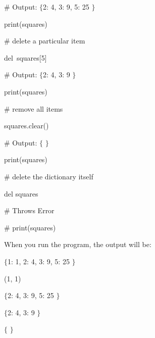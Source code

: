 \documentclass[a4paper,12pt]{report}
\begin{document}
\vspace{12pt}
\noindent 
 \hspace*{0.5in}  $  \#  $ Output:  $  \{  $2: 4, 3: 9, 5: 25 $  \}  $ \par
\noindent 
 \hspace*{0.5in} print(squares) \par
\vspace{12pt}
\noindent 
 \hspace*{0.5in}  $  \#  $ delete a particular item \par
\noindent 
 \hspace*{0.5in} del~squares[5]   \par
\vspace{12pt}
\noindent 
 \hspace*{0.5in}  $  \#  $ Output:  $  \{  $2: 4, 3: 9 $  \}  $ \par
\noindent 
 \hspace*{0.5in} print(squares) \par
\vspace{12pt}
\noindent 
 \hspace*{0.5in}  $  \#  $ remove all items \par
\noindent 
 \hspace*{0.5in} squares.clear() \par
\vspace{12pt}
\noindent 
 \hspace*{0.5in}  $  \#  $ Output:  $  \{  $ $  \}  $ \par
\noindent 
 \hspace*{0.5in} print(squares) \par
\vspace{12pt}
\noindent 
 \hspace*{0.5in}  $  \#  $ delete the dictionary itself \par
\noindent 
 \hspace*{0.5in} del squares \par
\vspace{12pt}
\noindent 
 \hspace*{0.5in}  $  \#  $ Throws Error \par
\noindent 
 \hspace*{0.5in}  $  \#  $ print(squares) \par
\noindent 
When you run the program, the output will be: \par
\noindent 
{\fontsize{11pt}{11pt}} \par
\noindent 
{\fontsize{11pt}{11pt}\selectfont  $  \{  $1: 1, 2: 4, 3: 9, 5: 25 $  \}  $} \par
\noindent 
{\fontsize{11pt}{11pt}\selectfont (1, 1)} \par
\noindent 
{\fontsize{11pt}{11pt}\selectfont  $  \{  $2: 4, 3: 9, 5: 25 $  \}  $} \par
\noindent 
{\fontsize{11pt}{11pt}\selectfont  $  \{  $2: 4, 3: 9 $  \}  $} \par
\noindent 
{\fontsize{11pt}{11pt}\selectfont  $  \{  $ $  \}  $} \par
\end{document}
